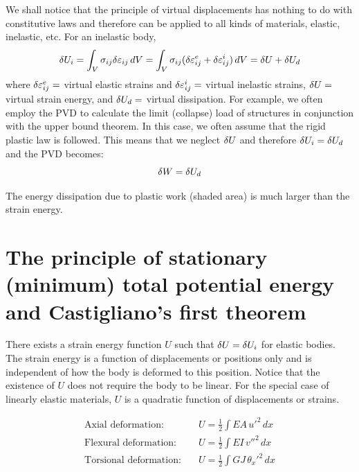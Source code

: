 We shall notice that the principle of virtual displacements has nothing to do with constitutive laws and therefore can be applied to all kinds of materials, elastic, inelastic, etc. For an inelastic body,
\begin{equation}
  \delta U_i = \int_V\sigma_{ij}\delta\varepsilon_{ij}\,dV = \int_V\sigma_{ij}(\delta\varepsilon^e_{ij}+\delta\varepsilon^i_{ij})\,dV = \delta U + \delta U_d
\end{equation}
where $\delta\varepsilon^e_{ij} =$ virtual elastic strains and $\delta\varepsilon^i_{ij} =$ virtual inelastic strains, $\delta U =$ virtual strain energy, and $\delta U_d =$ virtual dissipation. For example, we often employ the PVD to calculate the limit (collapse) load of structures in conjunction with the upper bound theorem. In this case, we often assume that the rigid plastic law is followed. This means that we neglect $\delta U$ and therefore $\delta U_i = \delta U_d$ and the PVD becomes:
\begin{equation}
  \delta W = \delta U_d
\end{equation}
\begin{center}
  \begin{minipage}{0.35\linewidth}\centering\end{minipage}\hfill
  \begin{minipage}{0.6\linewidth}The energy dissipation due to plastic work (shaded area) is much larger than the strain energy.\end{minipage}
\end{center}

\section{The principle of stationary (minimum) total potential energy and Castigliano's first theorem}
There exists a strain energy function $U$ such that $\delta U = \delta U_i$ for elastic bodies. The strain energy is a function of displacements or positions only and is independent of how the body is deformed to this position. Notice that the existence of $U$ does not require the body to be linear. For the special case of linearly elastic materials, $U$ is a quadratic function of displacements or strains.

\begin{align*}
  \text{Axial deformation:}& \quad U = \tfrac12\int EA\,u'^2\,dx\\
  \text{Flexural deformation:}& \quad U = \tfrac12\int EI\,v''^2\,dx\\
  \text{Torsional deformation:}& \quad U = \tfrac12\int GJ\,\theta_x'^2\,dx
\end{align*}


